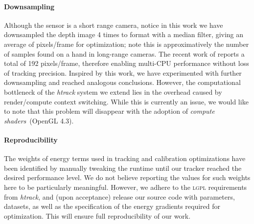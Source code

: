 \paragraph{Downsampling}
Although the \realsense{} sensor is a short range camera, notice in this work we have downsampled the depth image 4 times to  format with a median filter, giving an average of  pixels/frame for optimization; note this is approximatively the number of samples found on a hand in long-range cameras. The recent work of \cite{taylor2016concerto} reports a total of 192 pixels/frame, therefore enabling multi-CPU performance without loss of tracking precision. Inspired by this work, we have experimented with further downsampling and reached analogous conclusions. However, the computational bottleneck of the \emph{htrack} system we extend lies in the overhead caused by render/compute context switching. While this is currently an issue, we would like to note that this problem will disappear with the adoption of \emph{compute shaders}~(OpenGL 4.3).

\paragraph{Reproducibility}
% 
The weights of energy terms used in tracking and calibration optimizations have been identified by manually tweaking the runtime until our tracker reached the desired performance level. 
We do not believe reporting the values for such weights here to be particularly meaningful. 
However, we adhere to the \textsc{lgpl} requirements from \emph{htrack}, and (upon acceptance) release our source code with parameters, datasets, as well as the specification of the energy gradients required for optimization. This will ensure full reproducibility of our work.


